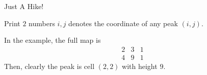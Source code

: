 \begin{problem}{Just A Hike!}
\OutputFile

Print $2$ numbers $i, j$ denotes the coordinate of any peak $(i, j)$.

\Examples

\begin{example}
%
\end{example}

\Notes

In the example, the full map is
    \begin{equation*}
    \begin{matrix}
        2 & 3 & 1\\
        4 & 9 & 1
    \end{matrix}
    \end{equation*}
Then, clearly the peak is cell $(2, 2)$ with height $9$.

\end{problem}
